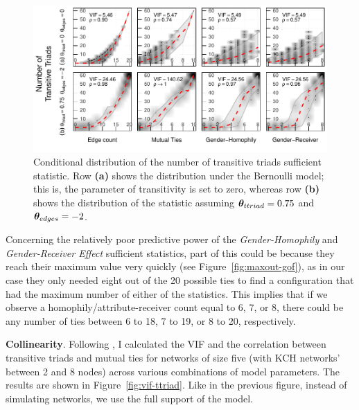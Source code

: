 \documentclass[12pt]{article}
\begin{document}

\begin{figure}[]
    \centering
    \includegraphics[width = .85\linewidth]{conditional-prob-ttriad.pdf}
    \caption[Conditional Distribution of the Transitive Triads Sufficient Statistic]{Conditional distribution of the number of transitive triads sufficient statistic. Row \textbf{(a)} shows the distribution under the Bernoulli model; this is, the parameter of transitivity is set to zero, whereas row \textbf{(b)} shows the distribution of the statistic assuming $\bm{\theta}_{ttriad} = 0.75$ and $\bm{\theta}_{edges} = -2$.}
    \label{fig:condprob-ttriads}
\end{figure}

Concerning the relatively poor predictive power of the \textit{Gender-Homophily} and \textit{Gender-Receiver Effect} sufficient statistics, part of this could be because they reach their maximum value very quickly (see Figure~\ref{fig:maxout-gof}), as in our case they only needed eight out of the 20 possible ties to find a configuration that had the maximum number of either of the statistics. This implies that if we observe a homophily/attribute-receiver count equal to 6, 7, or 8, there could be any number of ties between 6 to 18, 7 to 19, or 8 to 20, respectively.

\noindent \textbf{Collinearity}. Following \cite{duxburyDiagnosingMulticollinearityExponential2021}, I calculated the VIF and the correlation between transitive triads and mutual ties for networks of size five (with KCH networks' between 2 and 8 nodes) across various combinations of model parameters. The results are shown in Figure~\ref{fig:vif-ttriad}. Like in the previous figure, instead of simulating networks, we use the full support of the model.
\end{document}
